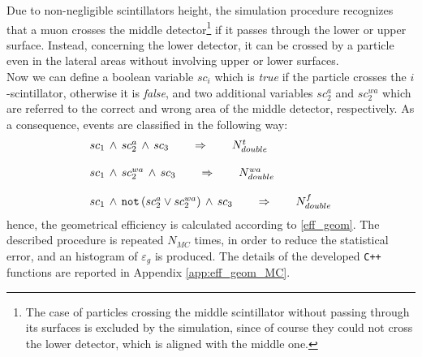Due to non-negligible scintillators height, the simulation procedure recognizes that a muon crosses the middle detector\footnote{The case of particles crossing the middle scintillator without passing through its surfaces is excluded by the simulation, since of course they could not cross the lower detector, which is aligned with the middle one.} if it passes through the lower or upper surface. Instead, concerning the lower detector, it can be crossed by a particle even in the lateral areas without involving upper or lower surfaces.\\

Now we can define a boolean variable $sc_i$ which is \emph{true} if the particle crosses the $i$-scintillator, otherwise it is \emph{false}, and two additional variables $sc_2^a$ and $sc_2^{wa}$ which are referred to the correct and wrong area of the middle detector, respectively. As a consequence, events are classified in the following way:
\begin{equation}
\begin{array}{l}
sc_1 \,\wedge\, sc_2^a \,\wedge\, sc_3 \qquad \Rightarrow \qquad N_{double}^t\\\\
sc_1 \,\wedge\, sc_2^{wa} \,\wedge\, sc_3 \qquad \Rightarrow \qquad N_{double}^{wa}\\\\
sc_1 \,\wedge\, \textrm{\texttt{not}} \left(sc_2^a \vee sc_2^{wa}\right) \,\wedge\, sc_3 \qquad \Rightarrow \qquad N_{double}^f
\end{array}
\end{equation}
hence, the geometrical efficiency is calculated according to \eqref{eff_geom}. The described procedure is repeated $N_{MC}$ times, in order to reduce the statistical error, and an histogram of $\varepsilon_{g}$ is produced. The details of the developed \texttt{C++} functions are reported in Appendix \ref{app:eff_geom_MC}.\\

